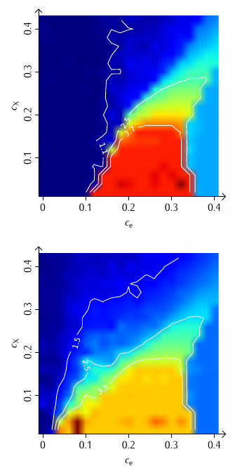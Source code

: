\documentclass[a4paper, 10pt, twoside, openany]{book} %
\begin{document}
\begin{figure}
\begin{minipage}[t]{0.48\textwidth}
			\label{H_penalty_random_D}
		\end{minipage}
		\begin{minipage}[t]{0.48\textwidth}
			\includegraphics[width=\textwidth]{Abbildungen/Phasendiagramme/Konturen/H_individual_D.pdf}
			\label{H_individual_D}
		\end{minipage}
		\hfill
		\begin{minipage}[t]{0.48\textwidth}
			\includegraphics[width=\textwidth]{Abbildungen/Phasendiagramme/Konturen/H_penalty_individual_D.pdf}

\end{minipage}
\end{figure}
\end{document}
